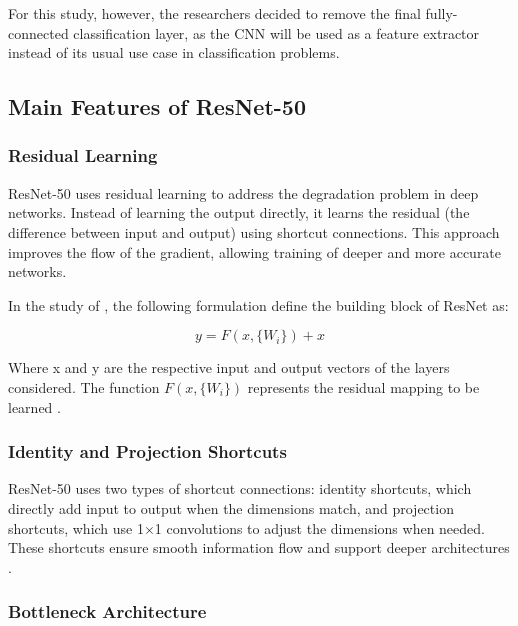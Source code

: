 \begin{refsection}
For this study, however, the researchers decided to remove the final fully-connected classification layer, as the CNN will be used as a feature extractor instead of its usual use case in classification problems.

\subsection{Main Features of ResNet-50}

\subsubsection{Residual Learning}

ResNet-50 uses residual learning to address the degradation problem in deep networks. Instead of learning the output directly, it learns the residual (the difference between input and output) using shortcut connections. This approach improves the flow of the gradient, allowing training of deeper and more accurate networks.

In the study of \citeauthor{he2015deepresiduallearningimage} \citeyear{he2015deepresiduallearningimage}, the following formulation define the building block of ResNet as:

\begin{equation}
y = F(x, \{W_i\}) + x
\label{eq:bbresnet}
\end{equation}

Where x and y are the respective input and output vectors of the layers considered. The function \(F(x, \{W_i\})\) represents the residual mapping to be learned \cite{he2015deepresiduallearningimage}.

\subsubsection{Identity and Projection Shortcuts}

ResNet-50 uses two types of shortcut connections: identity shortcuts, which directly add input to output when the dimensions match, and projection shortcuts, which use 1×1 convolutions to adjust the dimensions when needed. These shortcuts ensure smooth information flow and support deeper architectures \cite{he2015deepresiduallearningimage}.

\subsubsection{Bottleneck Architecture}


\end{refsection}
